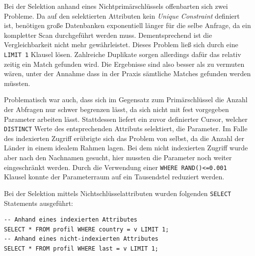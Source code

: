 Bei der Selektion anhand eines Nichtprimärschlüssels offenbarten sich zwei Probleme. Da auf den selektierten Attributen kein \emph{Unique Constraint} definiert ist, benötigen große Datenbanken exponentiell länger für die selbe Anfrage, da ein kompletter Scan durchgeführt werden muss. Dementsprechend ist die Vergleichbarkeit nicht mehr gewährleistet. Dieses Problem ließ sich durch eine \lstinline{LIMIT 1} Klausel lösen. Zahlreiche Duplikate sorgen allerdings dafür das relativ zeitig ein Match gefunden wird. Die Ergebnisse sind also besser als zu vermuten wären, unter der Annahme dass in der Praxis sämtliche Matches gefunden werden müssten.

Problematisch war auch, dass sich im Gegensatz zum Primärschlüssel die Anzahl der Abfragen nur schwer begrenzen lässt, da sich nicht mit fest vorgegeben Parameter arbeiten lässt. Stattdessen liefert ein zuvor definierter Cursor, welcher \lstinline{DISTINCT} Werte des entsprechenden Attributs selektiert, die Parameter. Im Falle des indexierten Zugriff erübrigte sich das Problem von selbst, da die Anzahl der Länder in einem idealem Rahmen lagen. Bei dem nicht indexierten Zugriff wurde aber nach den Nachnamen gesucht, hier mussten die Parameter noch weiter eingeschränkt werden. Durch die Verwendung einer \lstinline{WHERE RAND()<=0.001} Klausel konnte der Parameterraum auf ein Tausendstel reduziert werden.

Bei der Selektion mittels Nichtschlüsselattributen wurden folgenden \lstinline{SELECT} Statements ausgeführt:
\begin{lstlisting}
-- Anhand eines indexierten Attributes
SELECT * FROM profil WHERE country = v LIMIT 1;
-- Anhand eines nicht-indexierten Attributes
SELECT * FROM profil WHERE last = v LIMIT 1;
\end{lstlisting}

